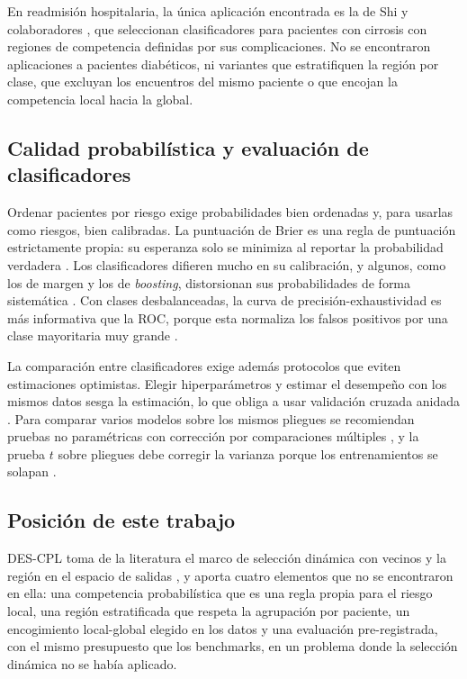 \documentclass[pdflatex,sn-mathphys-num]{sn-jnl}
\theoremstyle{plain}
\begin{document}
En readmisión hospitalaria, la única aplicación encontrada es la de Shi y colaboradores \cite{bib_shi_2025}, que seleccionan clasificadores para pacientes con cirrosis con regiones de competencia definidas por sus complicaciones. No se encontraron aplicaciones a pacientes diabéticos, ni variantes que estratifiquen la región por clase, que excluyan los encuentros del mismo paciente o que encojan la competencia local hacia la global.

\subsection{Calidad probabilística y evaluación de clasificadores}\label{subsec:rel_evaluacion}

Ordenar pacientes por riesgo exige probabilidades bien ordenadas y, para usarlas como riesgos, bien calibradas. La puntuación de Brier \cite{bib_brier} es una regla de puntuación estrictamente propia: su esperanza solo se minimiza al reportar la probabilidad verdadera \cite{bib_gneiting_2007}. Los clasificadores difieren mucho en su calibración, y algunos, como los de margen y los de \emph{boosting}, distorsionan sus probabilidades de forma sistemática \cite{bib_niculescu}. Con clases desbalanceadas, la curva de precisión-exhaustividad es más informativa que la ROC, porque esta normaliza los falsos positivos por una clase mayoritaria muy grande \cite{bib_saito}.

La comparación entre clasificadores exige además protocolos que eviten estimaciones optimistas. Elegir hiperparámetros y estimar el desempeño con los mismos datos sesga la estimación, lo que obliga a usar validación cruzada anidada \cite{bib_cawley}. Para comparar varios modelos sobre los mismos pliegues se recomiendan pruebas no paramétricas con corrección por comparaciones múltiples \cite{bib_demsar}, y la prueba $t$ sobre pliegues debe corregir la varianza porque los entrenamientos se solapan \cite{bib_nadeau_2003}.

\subsection{Posición de este trabajo}\label{subsec:rel_posicion}

DES-CPL toma de la literatura el marco de selección dinámica con vecinos \cite{bib_ko_2008} y la región en el espacio de salidas \cite{bib_cavalin_2013}, y aporta cuatro elementos que no se encontraron en ella: una competencia probabilística que es una regla propia para el riesgo local, una región estratificada que respeta la agrupación por paciente, un encogimiento local-global elegido en los datos y una evaluación pre-registrada, con el mismo presupuesto que los benchmarks, en un problema donde la selección dinámica no se había aplicado.
\end{document}
